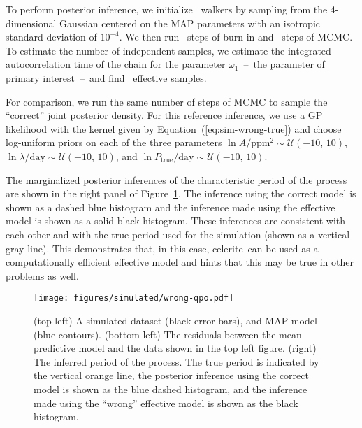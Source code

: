 \documentclass[manuscript, letterpaper]{aastex6}
\newcommand{\project}[1]{\textsf{#1}}
\newcommand{\celerite}{\project{celerite}}
\newcommand{\figureref}[1]{\ref{fig:#1}}
\newcommand{\Figure}[1]{Figure~\figureref{#1}}
\newcommand{\figurelabel}[1]{\label{fig:#1}}
\renewcommand{\eqref}[1]{\ref{eq:#1}}
\newcommand{\Eq}[1]{Equation~(\eqref{#1})}
\newcommand{\eq}[1]{\Eq{#1}}
\begin{document}
{    To perform posterior inference, we initialize \exampleiinwalkers~walkers by
    sampling from the 4-dimensional Gaussian centered on the MAP parameters with
    an isotropic standard deviation of $10^{-4}$.
    We then run \exampleiinburn~steps of burn-in and \exampleiinsteps~steps of
    MCMC.
    To estimate the number of independent samples, we estimate the integrated
    autocorrelation time of the chain for the parameter $\omega_1$~--~the
    parameter of primary interest~--~and find \exampleiineff~effective samples.

    For comparison, we run the same number of steps of MCMC to sample the
    ``correct'' joint posterior density.
    For this reference inference, we use a GP likelihood with the kernel given by
    \eq{sim-wrong-true} and choose log-uniform priors on each of the
    three parameters $\ln A/\mathrm{ppm}^2 \sim \mathcal{U}(-10,\,10)$,
    $\ln \lambda/\mathrm{day} \sim \mathcal{U}(-10,\,10)$, and
    $\ln P_\mathrm{true}/\mathrm{day} \sim \mathcal{U}(-10,\,10)$.

    The marginalized posterior inferences of the characteristic period of the
    process are shown in the right panel of \Figure{simulated-wrong}.
    The inference using the correct model is shown as a dashed blue histogram and
    the inference made using the effective model is shown as a solid black
    histogram.
    These inferences are consistent with each other and with the true period used
    for the simulation (shown as a vertical gray line).
    This demonstrates that, in this case, \celerite\ can be used as a
    computationally efficient effective model and hints that this may be true in
    other problems as well.
}



\begin{figure}[!hptb]
    \begin{center}
        \texttt{[image: figures/simulated/wrong-qpo.pdf]}
        \caption{(top left) A simulated dataset (black error bars), and MAP
            model (blue contours).
            (bottom left) The residuals between the mean predictive model and the data
            shown in the top left figure.
            (right) The inferred period of the process. The true period is indicated
            by the vertical orange line, the posterior inference using the correct
            model is shown as the blue dashed histogram, and the inference made using
            the ``wrong'' effective model is shown as the black histogram.
            \figurelabel{simulated-wrong}}
    \end{center}
\end{figure}
\end{document}
